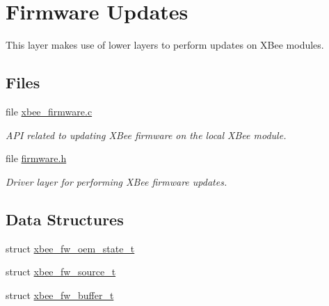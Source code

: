 \hypertarget{group__xbee__firmware}{\section{Firmware Updates}
\label{group__xbee__firmware}
}


This layer makes use of lower layers to perform updates on X\-Bee modules.  


\subsection*{Files}
\begin{DoxyCompactItemize}
\item 
file \hyperlink{xbee__firmware_8c}{xbee\-\_\-firmware.\-c}
\begin{DoxyCompactList}\small\item\em A\-P\-I related to updating X\-Bee firmware on the local X\-Bee module. \end{DoxyCompactList}\item 
file \hyperlink{firmware_8h}{firmware.\-h}
\begin{DoxyCompactList}\small\item\em Driver layer for performing X\-Bee firmware updates. \end{DoxyCompactList}\end{DoxyCompactItemize}
\subsection*{Data Structures}
\begin{DoxyCompactItemize}
\item 
struct \hyperlink{structxbee__fw__oem__state__t}{xbee\-\_\-fw\-\_\-oem\-\_\-state\-\_\-t}
\item 
struct \hyperlink{structxbee__fw__source__t}{xbee\-\_\-fw\-\_\-source\-\_\-t}
\item 
struct \hyperlink{structxbee__fw__buffer__t}{xbee\-\_\-fw\-\_\-buffer\-\_\-t}
\end{DoxyCompactItemize}
